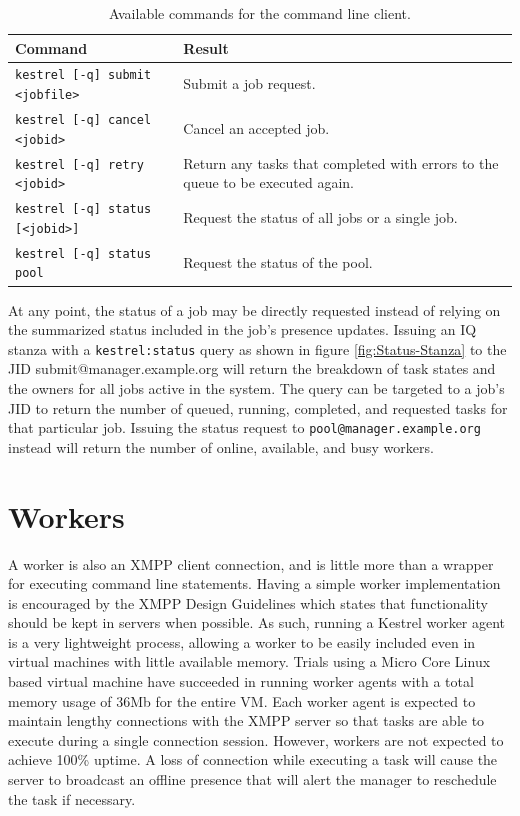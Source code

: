 %
\begin{table}
\begin{tabular*}{\columnwidth}{l p{}}
Command  & Result \\
\hline 
\texttt{kestrel {[}-q{]} submit <jobfile>}  & Submit a job request. \\
\texttt{kestrel {[}-q{]} cancel <jobid>}  & Cancel an accepted job. \\
\texttt{kestrel {[}-q{]} retry <jobid>}  & Return any tasks that completed with errors to the queue to be executed
again.\\
\texttt{kestrel {[}-q{]} status {[}<jobid>{]}}  & Request the status of all jobs or a single job. \\
\texttt{kestrel {[}-q{]} status pool}  & Request the status of the pool. \\
\end{tabular*}
\caption{\label{fig:Commands} Available commands for the command line client.}
\end{table}


At any point, the status of a job may be directly requested instead
of relying on the summarized status included in the job's presence
updates. Issuing an IQ stanza with a \texttt{kestrel:status} query
as shown in figure \ref{fig:Status-Stanza} to the JID submit@manager.example.org
will return the breakdown of task states and the owners for all jobs
active in the system. The query can be targeted to a job's JID to
return the number of queued, running, completed, and requested tasks
for that particular job. Issuing the status request to \texttt{pool@manager.example.org}
instead will return the number of online, available, and busy workers.


\section{Workers}
A worker is also an XMPP client connection, and is little more than a wrapper
for executing command line statements. Having a simple worker implementation
is encouraged by the XMPP Design Guidelines \cite{XEP-0134} which states that
functionality should be kept in servers when possible. As such, running a
Kestrel worker agent is a very lightweight process, allowing a worker to be
easily included even in virtual machines with little available memory. Trials
using a Micro Core Linux \cite{MicroCoreLinux} based virtual machine have
succeeded in running worker agents with a total memory usage of 36Mb for the
entire VM. Each worker agent is expected to maintain lengthy connections
with the XMPP server so that tasks are able to execute during a single connection
session. However, workers are not expected to achieve 100\% uptime. A loss of
connection while executing a task will cause the server to broadcast an offline
presence that will alert the manager to reschedule the task if necessary.

